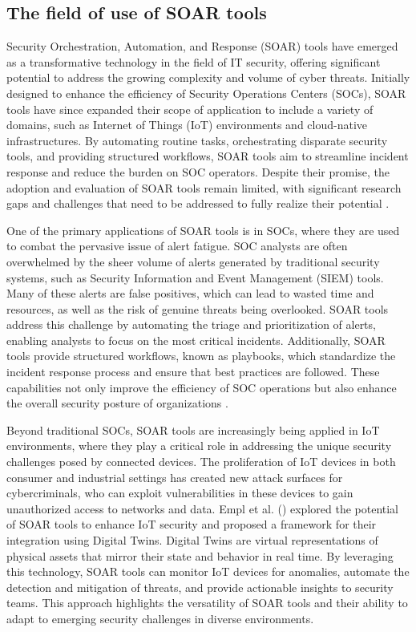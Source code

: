 \subsection{The field of use of SOAR tools}

Security Orchestration, Automation, and Response (SOAR) tools have emerged as a transformative technology in the field of IT security, offering significant potential to address the growing complexity and volume of cyber threats. Initially designed to enhance the efficiency of Security Operations Centers (SOCs), SOAR tools have since expanded their scope of application to include a variety of domains, such as Internet of Things (IoT) environments and cloud-native infrastructures. By automating routine tasks, orchestrating disparate security tools, and providing structured workflows, SOAR tools aim to streamline incident response and reduce the burden on SOC operators. Despite their promise, the adoption and evaluation of SOAR tools remain limited, with significant research gaps and challenges that need to be addressed to fully realize their potential \citep{bridges2023, empl2022}.

One of the primary applications of SOAR tools is in SOCs, where they are used to combat the pervasive issue of alert fatigue. SOC analysts are often overwhelmed by the sheer volume of alerts generated by traditional security systems, such as Security Information and Event Management (SIEM) tools. Many of these alerts are false positives, which can lead to wasted time and resources, as well as the risk of genuine threats being overlooked. SOAR tools address this challenge by automating the triage and prioritization of alerts, enabling analysts to focus on the most critical incidents. Additionally, SOAR tools provide structured workflows, known as playbooks, which standardize the incident response process and ensure that best practices are followed. These capabilities not only improve the efficiency of SOC operations but also enhance the overall security posture of organizations \citep{bridges2023}.

Beyond traditional SOCs, SOAR tools are increasingly being applied in IoT environments, where they play a critical role in addressing the unique security challenges posed by connected devices. The proliferation of IoT devices in both consumer and industrial settings has created new attack surfaces for cybercriminals, who can exploit vulnerabilities in these devices to gain unauthorized access to networks and data. Empl et al. (\citeyear{empl2022}) explored the potential of SOAR tools to enhance IoT security and proposed a framework for their integration using Digital Twins. Digital Twins are virtual representations of physical assets that mirror their state and behavior in real time. By leveraging this technology, SOAR tools can monitor IoT devices for anomalies, automate the detection and mitigation of threats, and provide actionable insights to security teams. This approach highlights the versatility of SOAR tools and their ability to adapt to emerging security challenges in diverse environments.

